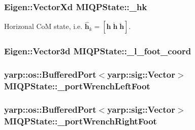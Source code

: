 {{\subsubsection[{\-\_\-hk}]{\setlength{\rightskip}{0pt plus 5cm}\-Eigen\-::\-Vector\-Xd {\bf \-M\-I\-Q\-P\-State\-::\-\_\-hk}}}\label{classMIQPState_aab11608d49f1401e1a44512e73157d16}
\-Horizonal \-Co\-M state, i.\-e. $\hat{\mathbf{h}}_k = [\mathbf{h}\;\dot{\mathbf{h}}\;\ddot{\mathbf{h}}]$. \hypertarget{classMIQPState_a5b51d0cbeab4414b0736de96a3c81b7b}{
\subsubsection[{\-\_\-l\-\_\-foot\-\_\-coord}]{\setlength{\rightskip}{0pt plus 5cm}\-Eigen\-::\-Vector3d {\bf \-M\-I\-Q\-P\-State\-::\-\_\-l\-\_\-foot\-\_\-coord}}}\label{classMIQPState_a5b51d0cbeab4414b0736de96a3c81b7b}
\hypertarget{classMIQPState_a9c042137f569724cd6ac62c0b2effdb1}{
\subsubsection[{\-\_\-port\-Wrench\-Left\-Foot}]{\setlength{\rightskip}{0pt plus 5cm}yarp\-::os\-::\-Buffered\-Port$<$yarp\-::sig\-::\-Vector$>$ {\bf \-M\-I\-Q\-P\-State\-::\-\_\-port\-Wrench\-Left\-Foot}}}\label{classMIQPState_a9c042137f569724cd6ac62c0b2effdb1}
\hypertarget{classMIQPState_a8e81519be2adf55a6d5e26457e1e07c2}{
\subsubsection[{\-\_\-port\-Wrench\-Right\-Foot}]{\setlength{\rightskip}{0pt plus 5cm}yarp\-::os\-::\-Buffered\-Port$<$yarp\-::sig\-::\-Vector$>$ {\bf \-M\-I\-Q\-P\-State\-::\-\_\-port\-Wrench\-Right\-Foot}}}\label{classMIQPState_a8e81519be2adf55a6d5e26457e1e07c2}
\hypertarget{classMIQPState_af01491319642a332145ba8e8c23306b0}{
}}
